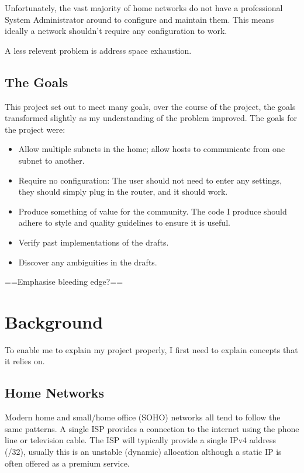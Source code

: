 \documentclass[12pt]{report}
\begin{document}
Unfortunately, the vast majority of home networks do not have a professional
System Administrator around to configure and maintain them. This means ideally
a network shouldn't require any configuration to work.

A less relevent problem is 
address space exhaustion. 

\section{The Goals}
This project set out to meet many goals, over the course of the project, the
goals transformed slightly as my understanding of the problem improved. The
goals for the project were:
\begin{itemize}
\item Allow multiple subnets in the home; allow hosts to communicate from one
  subnet to another.
\item Require no configuration: The user should not need to enter any settings,
  they should simply plug in the router, and it should work.
\item Produce something of value for the community. The code I produce should
  adhere to style and quality guidelines to ensure it is useful.
\item Verify past implementations of the drafts.
\item Discover any ambiguities in the drafts.
\end{itemize}

==Emphasise bleeding edge?==

\chapter{Background}
To enable me to explain my project properly, I first need to explain concepts
that it relies on.

\section{Home Networks}
Modern home and small/home office (SOHO) networks all tend to follow the same
patterns. A single ISP provides a connection to the internet using the phone
line or television cable.  The ISP will typically provide a single IPv4 address
(/32), usually this is an unstable (dynamic) allocation although a static IP is
often offered as a premium service. 
\end{document}
